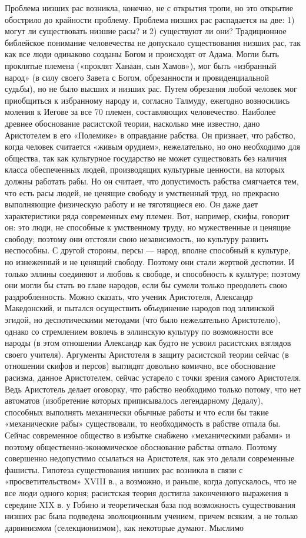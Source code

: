 Проблема низших рас возникла, конечно, не с открытия тропи, но это открытие обострило до крайности проблему. Проблема низших рас распадается на две: 1) могут ли существовать низшие расы? и 2) существуют ли они? Традиционное библейское понимание человечества не допускало существования низших рас, так как все люди одинаково созданы Богом и происходят от Адама. Могли быть проклятые племена («проклят Ханаан, сын Хамов»), мог быть «избранный народ» (в силу своего Завета с Богом, обрезанности и провиденциальной судьбы), но не было высших и низших рас. Путем обрезания любой человек мог приобщиться к избранному народу и, согласно Талмуду, ежегодно возносились моления к Иегове за все 70 племен, составляющих человечество. Наиболее древнее обоснование расистской теории, насколько мне известно, дано Аристотелем в его «Полемике» в оправдание рабства. Он признает, что рабство, когда человек считается «живым орудием», нежелательно, но оно необходимо для общества, так как культурное государство не может существовать без наличия класса обеспеченных людей, производящих культурные ценности, на которых должны работать рабы. Но он считает, что допустимость рабства смягчается тем, что есть расы людей, не ценящие свободу и умственный труд, но прекрасно выполняющие физическую работу и не тяготящиеся ею. Он даже дает характеристики ряда современных ему племен. Вот, например, скифы, говорит он: это люди, не способные к умственному труду, но мужественные и ценящие свободу; поэтому они отстояли свою независимость, но культуру развить неспособны. С другой стороны, персы — народ, вполне способный к культуре, но изнеженный и не ценящий свободу. Поэтому они стали жертвой деспотии. И только эллины соединяют и любовь к свободе, и способность к культуре; поэтому они могли бы стать во главе народов, если бы сумели только преодолеть свою раздробленность. Можно сказать, что ученик Аристотеля, Александр Македонский, и пытался осуществить объединение народов под эллинской эгидой, но деспотическими методами (что было нежелательно Аристотелю), однако со стремлением вовлечь в эллинскую культуру по возможности все народы (в этом отношении Александр как будто не усвоил расистских взглядов своего учителя). Аргументы Аристотеля в защиту расистской теории сейчас (в отношении скифов и персов) выглядят довольно комично, все обоснование расизма, данное Аристотелем, сейчас устарело с точки зрения самого Аристотеля. Ведь Аристотель делает оговорку, что рабство необходимо только потому, что нет автоматов (изобретение которых приписывалось легендарному Дедалу), способных выполнять механически обычные работы и что если бы такие «механические рабы» существовали, то необходимость в рабстве отпала бы. Сейчас современное общество в избытке снабжено «механическими рабами» и поэтому общественно-экономическое обоснование рабства отпало. Поэтому совершенно недопустимо ссылаться на Аристотеля, как это делали современные фашисты. Гипотеза существования низших рас возникла в связи с «просветительством» XVIII в., а возможно, и раньше, когда допускалось, что не все люди одного корня; расистская теория достигла законченного выражения в середине XIX в. у Гобино и теоретическая база под возможность существования низших рас была подведена эволюционным учением, причем всяким, а не только дарвинизмом (селекционизмом), как некоторые думают. Мыслимо 